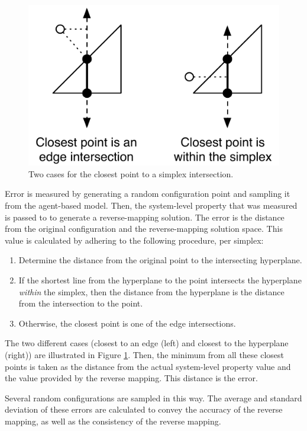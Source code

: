 \begin{figure}[ht]
\centering
\includegraphics[scale=1]{images/closest.pdf}
\caption{Two cases for the closest point to a simplex intersection.}
\label{fig:closest}
\end{figure}

Error is measured by generating a random configuration point and sampling it from the agent-based model.
Then, the system-level property that was measured is passed to \fw to generate a reverse-mapping solution.
The error is the distance from the original configuration and the reverse-mapping solution space.
This value is calculated by adhering to the following procedure, per simplex:
\begin{enumerate}
  \item Determine the distance from the original point to the intersecting hyperplane.
  \item If the shortest line from the hyperplane to the point intersects the hyperplane \textit{within} the simplex, then the distance from the hyperplane is the distance from the intersection to the point.
  \item Otherwise, the closest point is one of the edge intersections.
\end{enumerate}
The two different cases (closest to an edge (left) and closest to the hyperplane (right)) are illustrated in Figure \ref{fig:closest}.
Then, the minimum from all these closest points is taken as the distance from the actual system-level property value and the value provided by the reverse mapping.
This distance is the error.

Several random configurations are sampled in this way.
The average and standard deviation of these errors are calculated to convey the accuracy of the reverse mapping, as well as the consistency of the reverse mapping.

